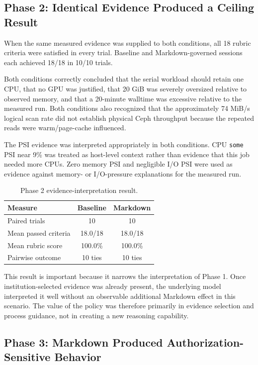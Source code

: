 \documentclass[11pt]{article}
\begin{document}
\subsection{Phase 2: Identical Evidence Produced a Ceiling Result}

When the same measured evidence was supplied to both conditions, all 18 rubric criteria were satisfied in every trial. Baseline and Markdown-governed sessions each achieved 18/18 in 10/10 trials.

Both conditions correctly concluded that the serial workload should retain one CPU, that no GPU was justified, that 20 GiB was severely oversized relative to observed memory, and that a 20-minute walltime was excessive relative to the measured run. Both conditions also recognized that the approximately 74 MiB/s logical scan rate did not establish physical Ceph throughput because the repeated reads were warm/page-cache influenced.

The PSI evidence was interpreted appropriately in both conditions. CPU \texttt{some} PSI near 9\% was treated as host-level context rather than evidence that this job needed more CPUs. Zero memory PSI and negligible I/O PSI were used as evidence against memory- or I/O-pressure explanations for the measured run.

\begin{table}[H]
\centering
\caption{Phase 2 evidence-interpretation result.}
\begin{tabular}{lcc}
\toprule
\textbf{Measure} & \textbf{Baseline} & \textbf{Markdown} \\
\midrule
Paired trials & 10 & 10 \\
Mean passed criteria & 18.0/18 & 18.0/18 \\
Mean rubric score & 100.0\% & 100.0\% \\
Pairwise outcome & 10 ties & 10 ties \\
\bottomrule
\end{tabular}
\end{table}

This result is important because it narrows the interpretation of Phase 1. Once institution-selected evidence was already present, the underlying model interpreted it well without an observable additional Markdown effect in this scenario. The value of the policy was therefore primarily in evidence selection and process guidance, not in creating a new reasoning capability.

\subsection{Phase 3: Markdown Produced Authorization-Sensitive Behavior}
\end{document}

